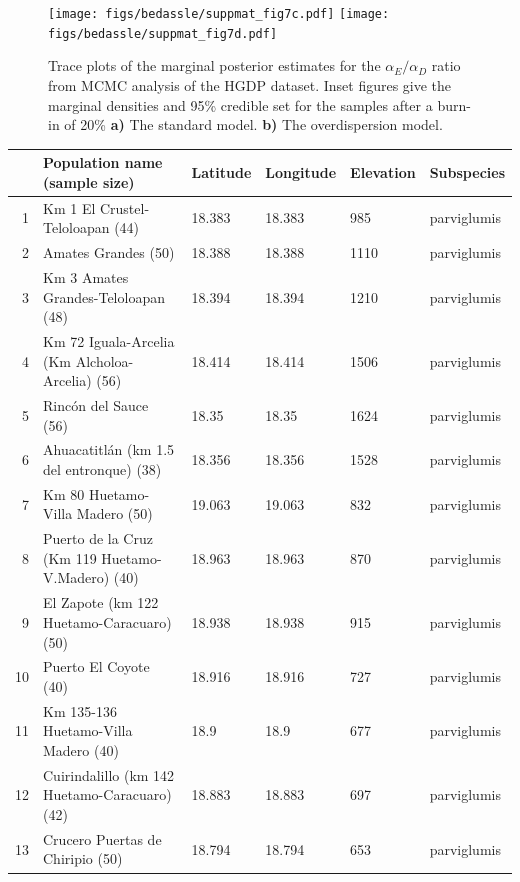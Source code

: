 \begin{figure}[ht!]
\begin{center}
  \texttt{[image: figs/bedassle/suppmat\_fig7c.pdf]}
  \texttt{[image: figs/bedassle/suppmat\_fig7d.pdf]}  
 \caption{
\textmd{Trace plots of the marginal posterior estimates for the $\alpha_{E} / \alpha_{D}$ ratio from MCMC analysis of the HGDP dataset.  Inset figures 
		give the marginal densities and 95\% credible set for the samples after a burn-in of 20\%}
	\textbf{a)}
 		The standard model.
	\textbf{b)}
 		The overdispersion model.
\label{sfig:him_traceplot}
  }
\end{center}
\end{figure}


\begin{table}
\begin{center}
\tiny{
    \begin{tabular}{r@{--}lllll}
  \hline
  & Population name (sample size) & Latitude & Longitude & Elevation & Subspecies \\ 
  \hline
1 & Km 1 El Crustel-Teloloapan (44) & 18.383 & 18.383 & 985 & parviglumis \\ 
2 & Amates Grandes (50) & 18.388 & 18.388 & 1110 & parviglumis \\ 
3 & Km 3 Amates Grandes-Teloloapan (48) & 18.394 & 18.394 & 1210 & parviglumis \\ 
4 & Km 72 Iguala-Arcelia (Km Alcholoa-Arcelia) (56) & 18.414 & 18.414 & 1506 & parviglumis \\ 
5 & Rinc\'on del Sauce (56) & 18.35 & 18.35 & 1624 & parviglumis \\ 
6 & Ahuacatitl\'an (km 1.5 del entronque) (38) & 18.356 & 18.356 & 1528 & parviglumis \\ 
7 & Km 80 Huetamo-Villa Madero (50) & 19.063 & 19.063 & 832 & parviglumis \\ 
8 & Puerto de la Cruz (Km 119 Huetamo-V.Madero) (40) & 18.963 & 18.963 & 870 & parviglumis \\ 
9 & El Zapote (km 122 Huetamo-Caracuaro) (50) & 18.938 & 18.938 & 915 & parviglumis \\ 
10 & Puerto El Coyote (40) & 18.916 & 18.916 & 727 & parviglumis \\ 
11 & Km 135-136 Huetamo-Villa Madero (40) & 18.9 & 18.9 & 677 & parviglumis \\ 
12 & Cuirindalillo (km 142 Huetamo-Caracuaro) (42) & 18.883 & 18.883 & 697 & parviglumis \\ 
13 & Crucero Puertas de Chiripio (50) & 18.794 & 18.794 & 653 & parviglumis \\ 

\end{tabular}}
\end{center}
\end{table}
